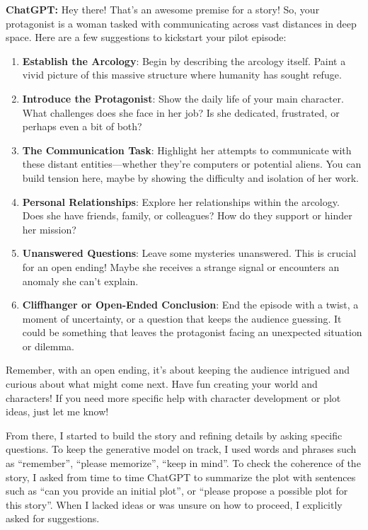\documentclass[a4paper,11pt]{article}
\newenvironment{shadedquotation1}
    {\colorlet{shadecolor}{JungleGreen!15}\begin{shaded*}
    \quoting[leftmargin=0cm, rightmargin=0cm, vskip=0pt]
    }
    {\endquoting
    \end{shaded*}
}
\begin{document}
\begin{shadedquotation1}
    \noindent\textbf{ChatGPT:} Hey there! That's an awesome premise for a story! So, your protagonist is a woman tasked with communicating across vast distances in deep space. Here are a few suggestions to kickstart your pilot episode:
    \begin{enumerate}
        \item \textbf{Establish the Arcology}: Begin by describing the arcology itself. Paint a vivid picture of this massive structure where humanity has sought refuge.
        \item \textbf{Introduce the Protagonist}: Show the daily life of your main character. What challenges does she face in her job? Is she dedicated, frustrated, or perhaps even a bit of both?
        \item \textbf{The Communication Task}: Highlight her attempts to communicate with these distant entities—whether they're computers or potential aliens. You can build tension here, maybe by showing the difficulty and isolation of her work.
        \item \textbf{Personal Relationships}: Explore her relationships within the arcology. Does she have friends, family, or colleagues? How do they support or hinder her mission?
        \item \textbf{Unanswered Questions}: Leave some mysteries unanswered. This is crucial for an open ending! Maybe she receives a strange signal or encounters an anomaly she can't explain.
        \item \textbf{Cliffhanger or Open-Ended Conclusion}: End the episode with a twist, a moment of uncertainty, or a question that keeps the audience guessing. It could be something that leaves the protagonist facing an unexpected situation or dilemma.
    \end{enumerate}

    Remember, with an open ending, it's about keeping the audience intrigued and curious about what might come next. Have fun creating your world and characters! If you need more specific help with character development or plot ideas, just let me know!
\end{shadedquotation1}

From there, I started to build the story and refining details by asking specific questions.  To keep the generative model on track, I used words and phrases such as ``remember'', ``please memorize'', ``keep in mind''. To check the coherence of the story, I asked from time to time ChatGPT to summarize the plot with sentences such as ``can you provide an initial plot'', or ``please propose a possible plot for this story''. When I lacked ideas or was unsure on how to proceed, I explicitly asked for suggestions.
\end{document}

